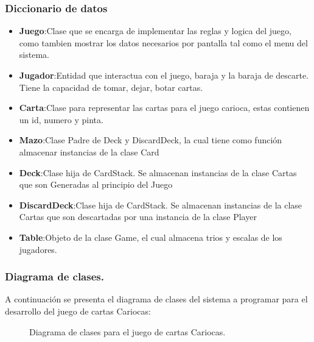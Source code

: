 \subsubsection{Diccionario de datos}\label{cap:diccionario-datos}
\begin{itemize}
    \item\textbf{Juego}:Clase que se encarga de implementar las reglas y logica del juego, \\como tambien mostrar los datos necesarios por pantalla tal como el menu del sistema. 
    \item\textbf{Jugador}:Entidad que interactua con el juego, baraja y la baraja de descarte. Tiene la capacidad de tomar, dejar, botar cartas.
    \item\textbf{Carta}:Clase para representar las cartas para el juego carioca, estas contienen un id, numero y pinta.
    \item\textbf{Mazo}:Clase Padre de Deck y DiscardDeck, la cual tiene como función almacenar instancias de la clase Card
    \item\textbf{Deck}:Clase hija de CardStack. Se almacenan instancias de la clase Cartas que son Generadas al principio del Juego
    \item\textbf{DiscardDeck}:Clase hija de CardStack. Se almacenan instancias de la clase Cartas que son descartadas por una instancia de la clase Player
    \item\textbf{Table}:Objeto de la clase Game, el cual almacena trios y escalas de los jugadores. 
\end{itemize}
\clearpage
\subsubsection{Diagrama de clases.}\label{cap:diagrama-clases}
A continuación se presenta el diagrama de clases del sistema a programar para el desarrollo del juego de cartas Cariocas:
\begin{figure}[H]
    \centering
    \caption{Diagrama de clases para el juego de cartas Cariocas.}
\end{figure}

\clearpage